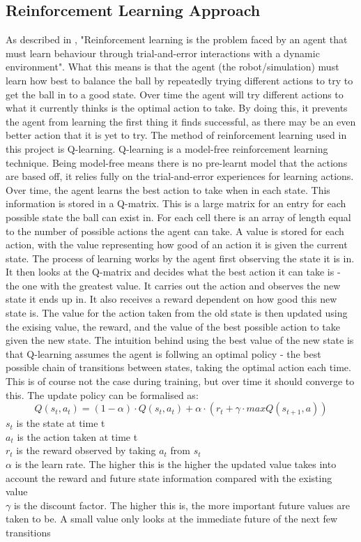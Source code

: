 \documentclass[12pt,a4paper]{article}
\begin{document}
\subsection{Reinforcement Learning Approach}
As described in \cite{rl_survey}, "Reinforcement learning is the problem faced by an agent that must learn behaviour through trial-and-error interactions with a dynamic environment". What this means is that the agent (the robot/simulation) must learn how best to balance the ball by repeatedly trying different actions to try to get the ball in to a good state. Over time the agent will try different actions to what it currently thinks is the optimal action to take. By doing this, it prevents the agent from learning the first thing it finds successful, as there may be an even better action that it is yet to try. The method of reinforcement learning used in this project is Q-learning. Q-learning is a model-free reinforcement learning technique. Being model-free means there is no pre-learnt model that the actions are based off, it relies fully on the trial-and-error experiences for learning actions. Over time, the agent learns the best action to take when in each state. This information is stored in a Q-matrix. This is a large matrix for an entry for each possible state the ball can exist in. For each cell there is an array of length equal to the number of possible actions the agent can take. A value is stored for each action, with the value representing how good of an action it is given the current state. The process of learning works by the agent first observing the state it is in. It then looks at the Q-matrix and decides what the best action it can take is - the one with the greatest value. It carries out the action and observes the new state it ends up in. It also receives a reward dependent on how good this new state is. The value for the action taken from the old state is then updated using the exising value, the reward, and the value of the best possible action to take given the new state. The intuition behind using the best value of the new state is that Q-learning assumes the agent is follwing an optimal policy - the best possible chain of transitions between states, taking the optimal action each time. This is of course not the case during training, but over time it should converge to this. The update policy can be formalised as:
\[Q(s_t, a_t) = (1 - \alpha) \cdot Q(s_t, a_t) + \alpha\cdot(r_t + \gamma\cdot max Q(s_{t+1}, a)) \]
$s_t$ is the state at time t \\
$a_t$ is the action taken at time t \\
$r_t$ is the reward observed by taking $a_t$ from $s_t$\\
$\alpha$ is the learn rate. The higher this is the higher the updated value takes into account the reward and future state information compared with the existing value\\
$\gamma$ is the discount factor. The higher this is, the more important future values are taken to be. A small value only looks at the immediate future of the next few transitions\\
\end{document}
